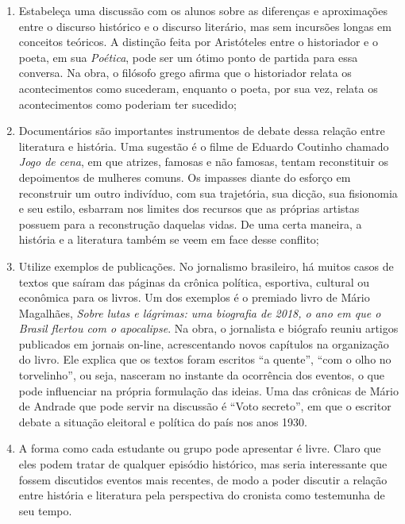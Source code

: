 \documentclass[12pt]{extarticle}
\begin{document}
\begin{enumerate}

\item
Estabeleça uma discussão com os alunos sobre as
diferenças e aproximações entre o discurso histórico e o discurso
literário, mas sem incursões longas em conceitos teóricos. A distinção
feita por Aristóteles entre o historiador e o poeta, em sua
\emph{Poética}, pode ser um ótimo ponto de partida para essa conversa.
Na obra, o filósofo grego afirma que o historiador relata os
acontecimentos como sucederam, enquanto o poeta, por sua vez, relata os
acontecimentos como poderiam ter sucedido;

\item
Documentários são importantes instrumentos de debate dessa relação
entre literatura e história. Uma sugestão é o filme de Eduardo Coutinho
chamado \emph{Jogo de cena}, em que atrizes, famosas e não
famosas, tentam reconstituir os depoimentos de mulheres comuns. Os
impasses diante do esforço em reconstruir um outro indivíduo, com sua
trajetória, sua dicção, sua fisionomia e seu estilo, esbarram nos
limites dos recursos que as próprias artistas possuem para a
reconstrução daquelas vidas. De uma certa maneira, a história e a
literatura também se veem em face desse conflito;

\item
Utilize exemplos de publicações. No jornalismo brasileiro, há muitos
casos de textos que saíram das páginas da crônica política, esportiva,
cultural ou econômica para os livros. Um dos exemplos é o premiado livro
de Mário Magalhães, \emph{Sobre lutas e lágrimas: uma biografia de 2018,
o ano em que o Brasil flertou com o apocalipse}. Na obra, o jornalista e
biógrafo reuniu artigos publicados em jornais on-line, acrescentando
novos capítulos na organização do livro. Ele explica que os textos foram
escritos ``a quente'', ``com o olho no torvelinho'', ou seja, nasceram
no instante da ocorrência dos eventos, o que pode influenciar na própria
formulação das ideias. Uma das crônicas de Mário de Andrade que pode
servir na discussão é ``Voto secreto'', em que o escritor debate a
situação eleitoral e política do país nos anos 1930.

\item
A forma como cada estudante ou grupo pode apresentar é livre. Claro
que eles podem tratar de qualquer episódio histórico, mas seria
interessante que fossem discutidos eventos mais recentes, de modo a
poder discutir a relação entre história e literatura pela perspectiva do
cronista como testemunha de seu tempo.
\end{enumerate}
\end{document}

